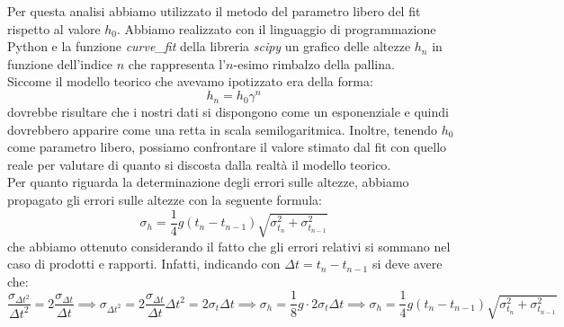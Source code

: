 \documentclass{article}
\begin{document}
Per questa analisi abbiamo utilizzato il metodo del parametro libero del fit rispetto al valore $h_0$. Abbiamo realizzato con il linguaggio di programmazione Python e la funzione \emph{curve\_fit} della libreria \emph{scipy} un grafico delle altezze $h_n$ in funzione dell'indice $n$ che rappresenta l'$n$-esimo rimbalzo della pallina. \\
Siccome il modello teorico che avevamo ipotizzato era della forma:
$$
	h_n = h_0 \gamma^n
$$
dovrebbe risultare che i nostri dati si dispongono come un esponenziale e quindi dovrebbero apparire come una retta in scala semilogaritmica. Inoltre,  tenendo $h_0$ come parametro libero, possiamo confrontare il valore stimato dal fit con quello reale per valutare di quanto si discosta dalla realtà il modello teorico. \\
Per quanto riguarda la determinazione degli errori sulle altezze, abbiamo propagato gli errori sulle altezze con la seguente formula:
$$
	\sigma_h = \frac{1}{4}g(t_n - t_{n-1})\sqrt{\sigma^2_{t_n} + \sigma^2_{t_{n-1}}}
$$
che abbiamo ottenuto considerando il fatto che gli errori relativi si sommano nel caso di prodotti e rapporti. Infatti, indicando con $\Delta t = t_n - t_{n-1}$ si deve avere che:
$$
	\frac{\sigma_{\Delta t^2}}{\Delta t^2} = 2\frac{\sigma_{\Delta t}}{\Delta t} \implies \sigma_{\Delta t^2} = 2\frac{\sigma_{\Delta t}}{\Delta t} \Delta t^{2} = 2\sigma_t \Delta t \implies \sigma_h = \frac{1}{8}g \cdot 2 \sigma_t \Delta t \implies \sigma_h = \frac{1}{4}g(t_n - t_{n-1})\sqrt{\sigma_{t_n}^2 + \sigma^2_{t_{n-1}}}
$$
\end{document}
